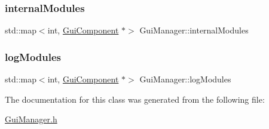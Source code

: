 \subsubsection{\texorpdfstring{internalModules}{internalModules}}
{\footnotesize\ttfamily std\+::map$<$int, \mbox{\hyperlink{class_gui_component}{Gui\+Component}} $\ast$$>$ Gui\+Manager\+::internal\+Modules\hspace{0.3cm}{\ttfamily [protected]}}

\mbox{\label{class_gui_manager_a949c60936bbbdc463ac190dcec53d173}} 
\subsubsection{\texorpdfstring{logModules}{logModules}}
{\footnotesize\ttfamily std\+::map$<$int, \mbox{\hyperlink{class_gui_component}{Gui\+Component}} $\ast$$>$ Gui\+Manager\+::log\+Modules\hspace{0.3cm}{\ttfamily [protected]}}



The documentation for this class was generated from the following file\+:\begin{DoxyCompactItemize}
\item 
\mbox{\hyperlink{_gui_manager_8h}{Gui\+Manager.\+h}}\end{DoxyCompactItemize}
